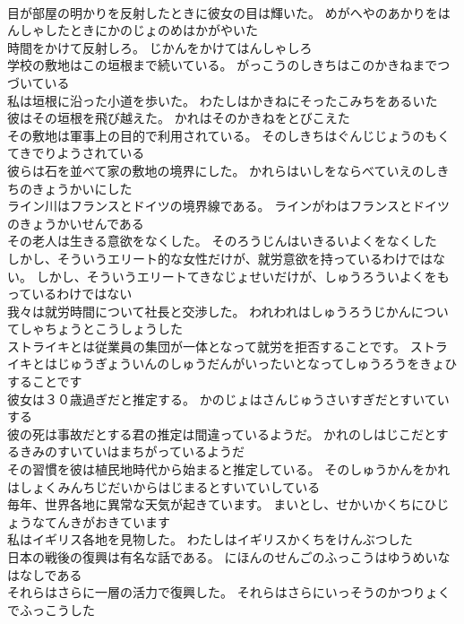 \documentclass[8pt]{extreport}
\begin{document}
\begin{CJK}{UTF8}{min}
\\	目が部屋の明かりを反射したときに彼女の目は輝いた。	めがへやのあかりをはんしゃしたときにかのじょのめはかがやいた 
\\	時間をかけて反射しろ。	じかんをかけてはんしゃしろ 
\\	学校の敷地はこの垣根まで続いている。	がっこうのしきちはこのかきねまでつづいている 
\\	私は垣根に沿った小道を歩いた。	わたしはかきねにそったこみちをあるいた 
\\	彼はその垣根を飛び越えた。	かれはそのかきねをとびこえた 
\\	その敷地は軍事上の目的で利用されている。	そのしきちはぐんじじょうのもくてきでりようされている 
\\	彼らは石を並べて家の敷地の境界にした。	かれらはいしをならべていえのしきちのきょうかいにした 
\\	ライン川はフランスとドイツの境界線である。	ラインがわはフランスとドイツのきょうかいせんである 
\\	その老人は生きる意欲をなくした。	そのろうじんはいきるいよくをなくした 
\\	しかし、そういうエリート的な女性だけが、就労意欲を持っているわけではない。	しかし、そういうエリートてきなじょせいだけが、しゅうろういよくをもっているわけではない 
\\	我々は就労時間について社長と交渉した。	われわれはしゅうろうじかんについてしゃちょうとこうしょうした 
\\	ストライキとは従業員の集団が一体となって就労を拒否することです。	ストライキとはじゅうぎょういんのしゅうだんがいったいとなってしゅうろうをきょひすることです 
\\	彼女は３０歳過ぎだと推定する。	かのじょはさんじゅうさいすぎだとすいていする 
\\	彼の死は事故だとする君の推定は間違っているようだ。	かれのしはじこだとするきみのすいていはまちがっているようだ 
\\	その習慣を彼は植民地時代から始まると推定している。	そのしゅうかんをかれはしょくみんちじだいからはじまるとすいていしている 
\\	毎年、世界各地に異常な天気が起きています。	まいとし、せかいかくちにひじょうなてんきがおきています 
\\	私はイギリス各地を見物した。	わたしはイギリスかくちをけんぶつした 
\\	日本の戦後の復興は有名な話である。	にほんのせんごのふっこうはゆうめいなはなしである 
\\	それらはさらに一層の活力で復興した。	それらはさらにいっそうのかつりょくでふっこうした 

\end{CJK}
\end{document}
